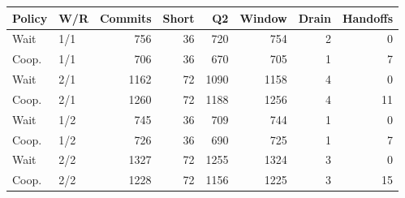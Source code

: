 \begin{tabular}{llrrrrrr}
\toprule
Policy & W/R & Commits & Short & Q2 & Window & Drain & Handoffs \\
\midrule
Wait & 1/1 & 756 & 36 & 720 & 754 & 2 & 0 \\
Coop. & 1/1 & 706 & 36 & 670 & 705 & 1 & 7 \\
Wait & 2/1 & 1162 & 72 & 1090 & 1158 & 4 & 0 \\
Coop. & 2/1 & 1260 & 72 & 1188 & 1256 & 4 & 11 \\
Wait & 1/2 & 745 & 36 & 709 & 744 & 1 & 0 \\
Coop. & 1/2 & 726 & 36 & 690 & 725 & 1 & 7 \\
Wait & 2/2 & 1327 & 72 & 1255 & 1324 & 3 & 0 \\
Coop. & 2/2 & 1228 & 72 & 1156 & 1225 & 3 & 15 \\
\bottomrule
\end{tabular}
